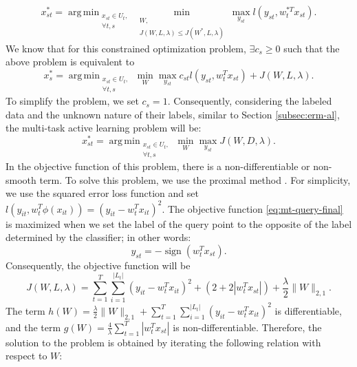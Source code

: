 \documentclass[12pt]{article}
\DeclareMathOperator*{\argmin}{arg\,min}
\begin{document}
	\begin{equation}
		\label{eq:mt-query-constrained}
		x^*_{st} = \argmin_{\substack{x_{st} \in U_t, \\ \forall t, s}} \min_{\substack{W, \\ J(W,L,\lambda) \le J(W^*,L,\lambda)}} \max_{y_{st}} l(y_{st}, w_t^{*T} x_{st}).
	\end{equation}
	We know that for this constrained optimization problem, $\exists c_s \ge 0$ such that the above problem is equivalent to
	\begin{equation}
		\label{eq:mt-query-lagrange}
		x^*_s = \argmin_{\substack{x_{st} \in U_t, \\ \forall t, s}} \min_{W} \max_{y_{st}} c_{st} l(y_{st}, w_t^T x_{st}) + J(W, L, \lambda).
	\end{equation}
	To simplify the problem, we set $c_s = 1$. Consequently, considering the labeled data and the unknown nature of their labels, similar to Section \ref{subsec:erm-al}, the multi-task active learning problem will be:
	\begin{equation}
		\label{eq:mt-query-final}
		x^*_{st} = \argmin_{\substack{x_{st} \in U_t, \\ \forall t, s}} \min_{W} \max_{y_{st}} J(W, D, \lambda).
	\end{equation}
	In the objective function of this problem, there is a non-differentiable or non-smooth term. To solve this problem, we use the proximal method \cite{parikh2014proximal}. For simplicity, we use the squared error loss function and set $l(y_{it}, w_t^T \phi(x_{it})) = (y_{it} - w_t^T x_{it})^2$. The objective function \eqref{eq:mt-query-final} is maximized when we set the label of the query point to the opposite of the label determined by the classifier; in other words:
	\begin{equation}
		y_{st} = -\operatorname{sign}(w_t^T x_{st}).
	\end{equation}
	Consequently, the objective function will be
	\begin{equation}
		J(W, L, \lambda) = \sum_{t=1}^{T} \sum_{i=1}^{|L_t|} (y_{it} - w_t^T x_{it})^2 + (2 + 2|w_t^T x_{st}|) + \frac{\lambda}{2}\|W\|_{2,1}.
	\end{equation}
	The term $h(W) = \frac{\lambda}{2}\|W\|_{2,1} + \sum_{t=1}^{T} \sum_{i=1}^{|L_t|} (y_{it} - w_t^T x_{it})^2$ is differentiable, and the term $g(W) = \frac{4}{\lambda} \sum_{t=1}^{T} |w_t^T x_{st}|$ is non-differentiable. Therefore, the solution to the problem is obtained by iterating the following relation with respect to $W$:
\end{document}
